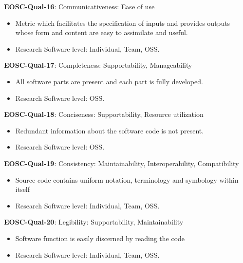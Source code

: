 \textbf{EOSC-Qual-16}: Communicativeness: Ease of use

\begin{itemize}
    \item Metric which facilitates the specification of inputs and provides outputs whose form and content are easy to assimilate and useful.~\cite{boehm_quantitative_1976,raymond_software_2013}
    \item Research Software level: Individual, Team, OSS.
\end{itemize}

\textbf{EOSC-Qual-17}: Completeness: Supportability, Manageability

\begin{itemize}
    \item All software parts are present and each part is fully developed.~\cite{iso_25010_2011_2017,boehm_quantitative_1976}
    \item Research Software level: OSS.
\end{itemize}

\textbf{EOSC-Qual-18}: Conciseness: Supportability, Resource utilization

\begin{itemize}
    \item Redundant information about the software code is not present.~\cite{boehm_quantitative_1976}
    \item Research Software level: OSS.
\end{itemize}

\textbf{EOSC-Qual-19}: Consistency: Maintainability, Interoperability, Compatibility

\begin{itemize}
    \item Source code contains uniform notation, terminology and symbology within itself~\cite{boehm_quantitative_1976,raymond_software_2013}
    \item Research Software level: Individual, Team, OSS.
\end{itemize}

\textbf{EOSC-Qual-20}: Legibility: Supportability, Maintainability

\begin{itemize}
    \item Software function is easily discerned by reading the code~\cite{boehm_quantitative_1976}
    \item Research Software level: Individual, Team, OSS.
\end{itemize}

